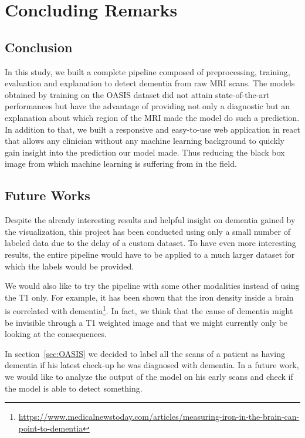 \chapter{Concluding Remarks}
\label{chap:conculusion}

\section{Conclusion}
In this study, we built a complete pipeline composed of preprocessing, training, evaluation and explanation to detect dementia from raw MRI scans. The models obtained by training on the OASIS dataset did not attain state-of-the-art performances but have the advantage of providing not only a diagnostic but an explanation about which region of the MRI made the model do such a prediction. In addition to that, we built a responsive and easy-to-use web application in react\footnotemark{} that allows any clinician without any machine learning background to quickly gain insight into the prediction our model made. Thus reducing the black box image from which machine learning is suffering from in the field.  


\section{Future Works}
Despite the already interesting results and helpful insight on dementia gained by the visualization, this project has been conducted using only a small number of labeled data due to the delay of a custom dataset. To have even more interesting results, the entire pipeline would have to be applied to a much larger dataset for which the labels would be provided.

We would also like to try the pipeline with some other modalities instead of using the T1 only. For example, it has been shown that the iron density inside a brain is correlated with dementia\footnote{\href{https://www.medicalnewstoday.com/articles/measuring-iron-in-the-brain-can-point-to-dementia}{https://www.medicalnewstoday.com/articles/measuring-iron-in-the-brain-can-point-to-dementia}}. In fact, we think that the cause of dementia might be invisible through a T1 weighted image and that we might currently only be looking at the consequences.

In section~\ref{sec:OASIS} we decided to label all the scans of a patient as having dementia if his latest check-up he was diagnosed with dementia. In a future work, we would like to analyze the output of the model on his early scans and check if the model is able to detect something.

